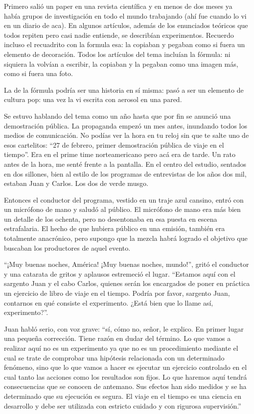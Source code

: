 \documentclass[12pt,twoside,openright]{book}
\begin{document}
Primero salió un paper en una revista científica y en menos de dos meses ya había grupos de investigación en todo el mundo trabajando (ahí fue cuando lo vi en un diario de aca). En algunos artículos, además de los enunciados teóricos que todos repiten pero casi nadie entiende, se describían experimentos. Recuerdo incluso el recuadrito con la formula esa: la copiaban y pegaban como si fuera un elemento de decoración. Todos los artículos del tema incluían la fórmula: ni siquiera la volvían a escribir, la copiaban y la pegaban como una imagen más, como si fuera una foto.

La de la fórmula podría ser una historia en sí misma: pasó a ser un elemento de cultura pop: una vez la vi escrita con aerosol en una pared.

Se estuvo hablando del tema como un año hasta que por fin se anunció una demostración pública. La propaganda empezó un mes antes, inundando todos los medios de comunicación. No podías ver la hora en tu reloj sin que te salte uno de esos cartelitos: “27 de febrero, primer demostración pública de viaje en el tiempo”. Era en el prime time norteamericano pero acá era de tarde. Un rato antes de la hora, me senté frente a la pantalla. En el centro del estudio, sentados en dos sillones, bien al estilo de los programas de entrevistas de los años dos mil, estaban Juan y Carlos. Los dos de verde musgo.

Entonces el conductor del programa, vestido en un traje azul cansino, entró con un micrófono de mano y saludó al público. El micrófono de mano era más bien un detalle de los ochenta, pero no desentonaba en esa puesta en escena estrafalaria. El hecho de que hubiera público en una emisión, también era totalmente anacrónico, pero supongo que la mezcla habrá logrado el objetivo que buscaban los productores de aquel evento.

“¡Muy buenas noches, América! ¡Muy buenas noches, mundo!”, gritó el conductor y una catarata de gritos y aplausos estremeció el lugar. “Estamos aquí con el sargento Juan y el cabo Carlos, quienes serán los encargados de poner en práctica un ejercicio de libro de viaje en el tiempo. Podría por favor, sargento Juan, contarnos en qué consiste el experimento. ¿Está bien que lo llame así, experimento?”.

Juan habló serio, con voz grave: “sí, cómo no, señor, le explico. En primer lugar una pequeña corrección. Tiene razón en dudar del término. Lo que vamos a realizar aquí no es un experimento ya que no es un procedimiento mediante el cual se trate de comprobar una hipótesis relacionada con un determinado fenómeno, sino que lo que vamos a hacer es ejecutar un ejercicio controlado en el cual tanto las acciones como los resultados son fijos. Lo que haremos aquí tendrá consecuencias que se conocen de antemano. Sus efectos han sido medidos y se ha determinado que su ejecución es segura. El viaje en el tiempo es una ciencia en desarrollo y debe ser utilizada con estricto cuidado y con rigurosa supervisión.”
\end{document}
